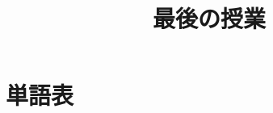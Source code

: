 \documentclass[10pt]{amsart}
\title{最後の授業}
\begin{document}
	\maketitle
	\thispagestyle{empty}
	
	\section*{単語表}

	\begin{multicols}{2}\noindent
		
	\end{multicols}
\end{document}
